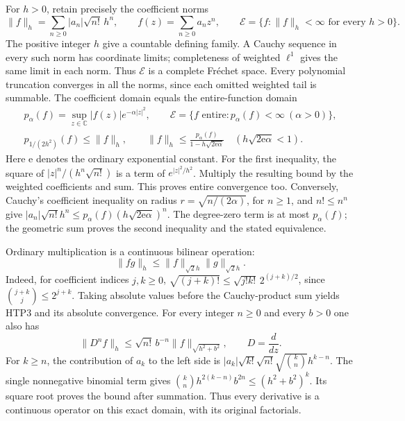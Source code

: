 For $h>0$, retain precisely the coefficient norms
\begin{equation}\tag{HTP1}
 \|f\|_h=\sum_{n\ge0}|a_n|\sqrt{n!}\,h^n,
 \qquad f(z)=\sum_{n\ge0}a_nz^n,\qquad
 \mathcal E=\{f:\|f\|_h<\infty\text{ for every }h>0\}.
\end{equation}
The positive integer $h$ give a countable defining family.
A Cauchy sequence in every such norm has coordinate limits;
completeness of weighted $\ell^1$ gives the same limit in each
norm. Thus $\mathcal E$ is a complete Fr\'echet space.
Every polynomial truncation converges in all the norms, since
each omitted weighted tail is summable. The coefficient domain
equals the entire-function domain
\begin{equation}\tag{HTP2}
\begin{gathered}
 p_\alpha(f)=\sup_{z\in\mathbb C}|f(z)|e^{-\alpha|z|^2},\qquad
 \mathcal E=\{f\text{ entire}:p_\alpha(f)<\infty\ (\alpha>0)\},\\
 p_{1/(2h^2)}(f)\le\|f\|_h,\qquad
 \|f\|_h\le\frac{p_\alpha(f)}{1-h\sqrt{2\mathrm e\alpha}}
       \quad(h\sqrt{2\mathrm e\alpha}<1).
\end{gathered}
\end{equation}
Here $\mathrm e$ denotes the ordinary exponential constant.
For the first inequality, the square of
$|z|^n/(h^n\sqrt{n!})$ is a term of
$e^{|z|^2/h^2}$. Multiply the resulting bound by the weighted
coefficients and sum. This proves entire convergence too.
Conversely, Cauchy's coefficient inequality on radius
$r=\sqrt{n/(2\alpha)}$, for $n\ge1$, and $n!\le n^n$ give
$|a_n|\sqrt{n!}h^n\le
p_\alpha(f)(h\sqrt{2\mathrm e\alpha})^n$.
The degree-zero term is at most $p_\alpha(f)$; the geometric
sum proves the second inequality and the stated equivalence.

Ordinary multiplication is a continuous bilinear operation:
\begin{equation}\tag{HTP3}
                \|fg\|_h\le\|f\|_{\sqrt2h}\|g\|_{\sqrt2h}.
\end{equation}
Indeed, for coefficient indices $j,k\ge0$,
$\sqrt{(j+k)!}\le\sqrt{j!k!}\,2^{(j+k)/2}$, since
$\binom{j+k}{j}\le2^{j+k}$. Taking absolute values before
the Cauchy-product sum yields HTP3 and its absolute convergence.
For every integer $n\ge0$ and every $b>0$ one also has
\begin{equation}\tag{HTP4}
          \|D^nf\|_h\le\sqrt{n!}\,b^{-n}
                                \|f\|_{\sqrt{h^2+b^2}},
          \qquad D=\frac{d}{dz}.
\end{equation}
For $k\ge n$, the contribution of $a_k$ to the left side is
$|a_k|\sqrt{k!}\sqrt{n!}\sqrt{\binom kn}h^{k-n}$.
The single nonnegative binomial term gives
$\binom kn h^{2(k-n)}b^{2n}\le(h^2+b^2)^k$.
Its square root proves the bound after summation.
Thus every derivative is a continuous operator on this exact
domain, with its original factorials.

